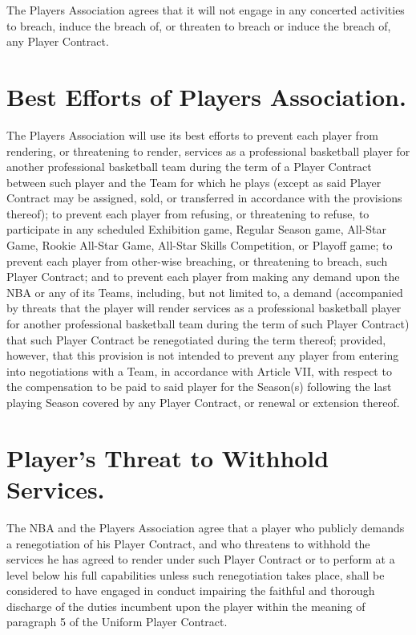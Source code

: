 \documentclass[
]{book}
\begin{document}
The Players Association agrees that it will not engage in any concerted activities to breach, induce the breach of, or threaten to breach or induce the breach of, any Player Contract.

\hypertarget{best-efforts-of-players-association.}{%
\section{Best Efforts of Players Association.}\label{best-efforts-of-players-association.}}

The Players Association will use its best efforts to prevent each player from rendering, or threatening to render, services as a professional basketball player for another professional basketball team during the term of a Player Contract between such player and the Team for which he plays (except as said Player Contract may be assigned, sold, or transferred in accordance with the provisions thereof); to prevent each player from refusing, or threatening to refuse, to participate in any scheduled Exhibition game, Regular Season game, All-Star Game, Rookie All-Star Game, All-Star Skills Competition, or Playoff game; to prevent each player from other-wise breaching, or threatening to breach, such Player Contract; and to prevent each player from making any demand upon the NBA or any of its Teams, including, but not limited to, a demand (accompanied by threats that the player will render services as a professional basketball player for another professional basketball team during the term of such Player Contract) that such Player Contract be renegotiated during the term thereof; provided, however, that this provision is not intended to prevent any player from entering into negotiations with a Team, in accordance with Article VII, with respect to the compensation to be paid to said player for the Season(s) following the last playing Season covered by any Player Contract, or renewal or extension thereof.

\hypertarget{players-threat-to-withhold-services.}{%
\section{Player's Threat to Withhold Services.}\label{players-threat-to-withhold-services.}}

The NBA and the Players Association agree that a player who publicly demands a renegotiation of his Player Contract, and who threatens to withhold the services he has agreed to render under such Player Contract or to perform at a level below his full capabilities unless such renegotiation takes place, shall be considered to have engaged in conduct impairing the faithful and thorough discharge of the duties incumbent upon the player within the meaning of paragraph 5 of the Uniform Player Contract.
\end{document}
